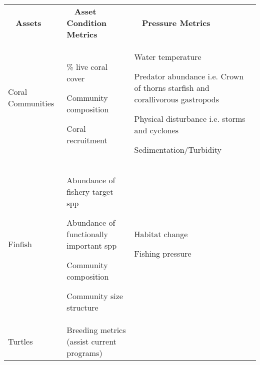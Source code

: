 \documentclass[version=last,
    paper=a4,                               %
    10pt,                                   %
    dvipsnames,
    oneside,                              %
    headings=openany,                       %
    open=any,
    BCOR=7mm,                               %
    DIV=15,     %
]{scrbook}
\begin{document}
\begin{longtable}[]{@{}lll@{}}
\toprule
\endhead
\begin{minipage}[t]{0.30\columnwidth}\raggedright
\textbf{~ Assets}\strut
\end{minipage} & \begin{minipage}[t]{0.30\columnwidth}\raggedright
\textbf{~ Asset Condition Metrics}\strut
\end{minipage} & \begin{minipage}[t]{0.30\columnwidth}\raggedright
\textbf{~ Pressure Metrics}\strut
\end{minipage}\tabularnewline
\begin{minipage}[t]{0.30\columnwidth}\raggedright
Coral Communities ~\strut
\end{minipage} & \begin{minipage}[t]{0.30\columnwidth}\raggedright
\% live coral cover

Community composition

Coral recruitment\strut
\end{minipage} & \begin{minipage}[t]{0.30\columnwidth}\raggedright
Water temperature

Predator abundance i.e. Crown of thorns starfish and corallivorous
gastropods

Physical disturbance i.e. storms and cyclones

Sedimentation/Turbidity\strut
\end{minipage}\tabularnewline
\begin{minipage}[t]{0.30\columnwidth}\raggedright
Finfish\strut
\end{minipage} & \begin{minipage}[t]{0.30\columnwidth}\raggedright
Abundance of fishery target spp

Abundance of functionally important spp

Community composition

Community size structure\strut
\end{minipage} & \begin{minipage}[t]{0.30\columnwidth}\raggedright
Habitat change

Fishing pressure\strut
\end{minipage}\tabularnewline
\begin{minipage}[t]{0.30\columnwidth}\raggedright
Turtles\strut
\end{minipage} & \begin{minipage}[t]{0.30\columnwidth}\raggedright
Breeding metrics (assist current programs)


\end{minipage}
\end{longtable}
\end{document}
